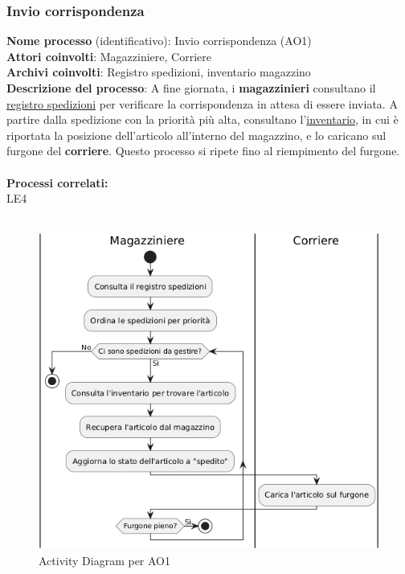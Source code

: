 \documentclass[a4paper,12pt]{article}
\begin{document}
\subsubsection{Invio corrispondenza}
\textbf{Nome processo} (identificativo): Invio corrispondenza (AO1) \\
\textbf{Attori coinvolti}: Magazziniere, Corriere \\
\textbf{Archivi coinvolti}: Registro spedizioni, inventario magazzino \\
\textbf{Descrizione del processo}: A fine giornata, i \textbf{magazzinieri} consultano il \underline{registro spedizioni} per verificare la corrispondenza
in attesa di essere inviata. A partire dalla spedizione con la priorità più alta, consultano l'\underline{inventario}, in cui è riportata la posizione dell'articolo
all'interno del magazzino, e lo caricano sul furgone del \textbf{corriere}. Questo processo si ripete fino al riempimento del furgone. \\ \\
\textbf{Processi correlati:}\\LE4\\ \\
\begin{figure}[H]
  \centering
  \includegraphics[width=0.8\linewidth]{assets/activitydiagram_AO1.png}
	\caption{Activity Diagram per AO1}
\end{figure}
\end{document}

